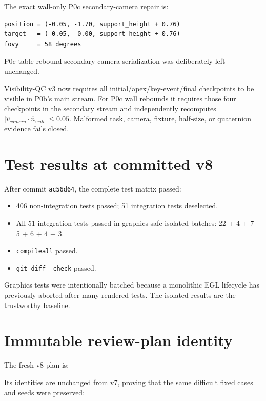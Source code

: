 \documentclass[11pt]{article}
\begin{document}
The exact wall-only P0c secondary-camera repair is:

\begin{verbatim}
position = (-0.05, -1.70, support_height + 0.76)
target   = (-0.05,  0.00, support_height + 0.76)
fovy     = 58 degrees
\end{verbatim}

P0c table-rebound secondary-camera serialization was deliberately left
unchanged.

Visibility-QC v3 now requires all initial/apex/key-event/final checkpoints to
be visible in P0b's main stream.  For P0c wall rebounds it requires those four
checkpoints in the secondary stream and independently recomputes
\(\lvert \hat v_{camera}\cdot\hat n_{wall}\rvert\leq 0.05\).  Malformed task,
camera, fixture, half-size, or quaternion evidence fails closed.

\section{Test results at committed v8}

After commit \texttt{ac56d64}, the complete test matrix passed:

\begin{itemize}
  \item 406 non-integration tests passed; 51 integration tests deselected.
  \item All 51 integration tests passed in graphics-safe isolated batches:
        22 + 4 + 7 + 5 + 6 + 4 + 3.
  \item \texttt{compileall} passed.
  \item \texttt{git diff --check} passed.
\end{itemize}

Graphics tests were intentionally batched because a monolithic EGL lifecycle
has previously aborted after many rendered tests.  The isolated results are
the trustworthy baseline.

\section{Immutable review-plan identity}

The fresh v8 plan is:


Its identities are unchanged from v7, proving that the same difficult fixed
cases and seeds were preserved:
\end{document}
